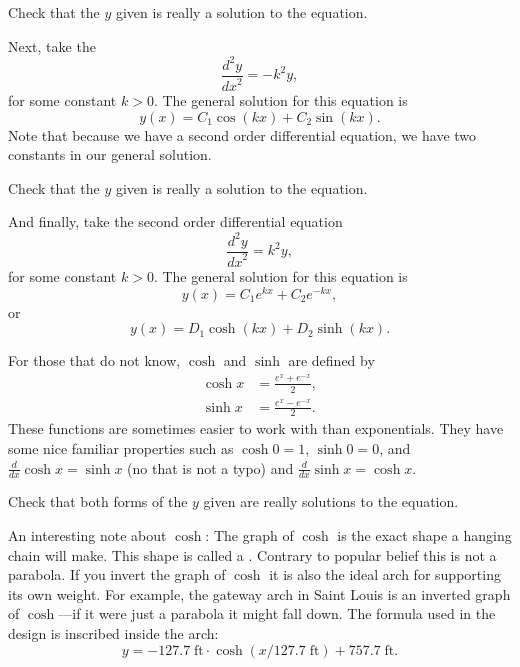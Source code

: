\documentclass[12pt]{book}
\begin{document}
\begin{exercise}
Check that the $y$ given is really a solution to the equation.
\end{exercise}

Next, take the
\emph{}
\begin{equation*}
\frac{d^2y}{{dx}^2} = -k^2 y ,
\end{equation*}
for some constant $k > 0$.
The general solution for this equation is
\begin{equation*}
y(x) = C_1 \cos(kx) + C_2 \sin(kx) .
\end{equation*}
Note that
because
we have a second order differential equation,
we have two constants in our general solution.

\begin{exercise}
Check that the $y$ given is really a solution to the equation.
\end{exercise}

And finally, take the second order differential equation
\begin{equation*}
\frac{d^2y}{{dx}^2} = k^2 y ,
\end{equation*}
for some constant $k > 0$.
The general solution for this equation is
\begin{equation*}
y(x) = C_1 e^{kx} + C_2 e^{-kx} ,
\end{equation*}
or
\begin{equation*}
y(x) = D_1 \cosh(kx) + D_2 \sinh(kx) .
\end{equation*}

For those that do not know, $\cosh$ and $\sinh$ are defined by
\begin{align*}
\cosh x &= \frac{e^{x} + e^{-x}}{2} , \\
\sinh x &= \frac{e^{x} - e^{-x}}{2} .
\end{align*}
These functions are sometimes easier to
work with than exponentials.  They have some nice familiar
properties such as
$\cosh 0 = 1$, $\sinh 0 = 0$, and $\frac{d}{dx} \cosh x = \sinh x$ (no that is
not a typo)
and $\frac{d}{dx} \sinh x = \cosh x$.

\begin{exercise}
Check that both forms of the $y$ given are
really solutions to the equation.
\end{exercise}

An interesting note about $\cosh$:  The graph of $\cosh$ is the exact shape
a hanging chain will make.  This shape is called
a \emph{}.
Contrary to popular belief this is not a
parabola.  If you invert the graph of $\cosh$ it is also the ideal arch for
supporting its own weight.
For example, the gateway arch in Saint Louis is an inverted graph of
$\cosh$---if it were just a parabola it might fall down.  The formula
used in the design is
inscribed inside the arch:
\begin{equation*}
y = -127.7 \; \textrm{ft} \cdot \cosh({x / 127.7  \; \textrm{ft}}) + 757.7 \;
\textrm{ft} .
\end{equation*}
\end{document}
